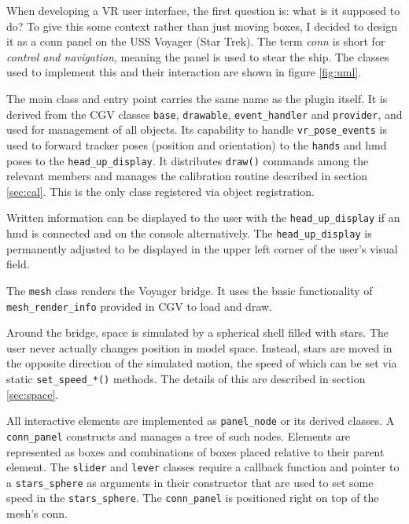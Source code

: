 \documentclass[hyperref, bachelorofscience]{cgvpub}
\begin{document}
When developing a VR user interface, the first question is: what is it supposed to do? To give this some context rather than just moving boxes, I decided to design it as a conn panel on the USS Voyager (Star Trek). The term \emph{conn} is short for \emph{control and navigation}, meaning the panel is used to stear the ship. The classes used to implement this and their interaction are shown in figure \ref{fig:uml}.

The main class and entry point carries the same name as the plugin itself. It is derived from the \gls{CGV} classes \lstinline|base|, \lstinline|drawable|, \lstinline|event_handler| and \lstinline|provider|, and used for management of all objects. Its capability to handle \lstinline|vr_pose_events| is used to forward tracker poses (position and orientation) to the \lstinline|hands| and \acrshort{hmd} poses to the \lstinline|head_up_display|. It distributes \lstinline|draw()| commands among the relevant members and manages the calibration routine described in section \ref{sec:cal}. This is the only class registered via object registration.

Written information can be displayed to the user with the \lstinline|head_up_display| if an \acrshort{hmd} is connected and on the console alternatively. The \lstinline|head_up_display| is permanently adjusted to be displayed in the upper left corner of the user's visual field.

The \lstinline|mesh| class renders the Voyager bridge. It uses the basic functionality of \lstinline|mesh_render_info| provided in \gls{CGV} to load and draw.

Around the bridge, space is simulated by a spherical shell filled with stars. The user never actually changes position in model space. Instead, stars are moved in the opposite direction of the simulated motion, the speed of which can be set via static \lstinline|set_speed_*()| methods. The details of this are described in section \ref{sec:space}.

All interactive elements are implemented as \lstinline|panel_node| or its derived classes. A \lstinline|conn_panel| constructs and manages a tree of such nodes. Elements are represented as boxes and combinations of boxes placed relative to their parent element. The \lstinline|slider| and \lstinline|lever| classes require a callback function and pointer to a \lstinline|stars_sphere| as arguments in their constructor that are used to set some speed in the \lstinline|stars_sphere|. The \lstinline|conn_panel| is positioned right on top of the mesh's conn.
\end{document}

